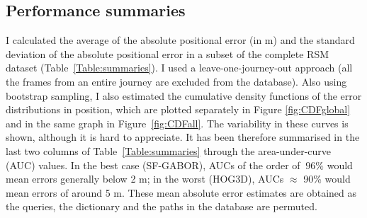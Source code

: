 \subsection{Performance summaries}
\label{visloc_perf}
I calculated the average of the absolute positional error (in m) and the standard deviation of the absolute positional error in a subset of the complete RSM dataset (Table~\ref{Table:summaries}). I  used a leave-one-journey-out approach (all the frames from an entire journey are excluded from the database).  Also using bootstrap sampling, I also estimated the cumulative density functions of the error distributions in position, which are plotted separately in Figure \ref{fig:CDFglobal} and in the same graph in Figure~\ref{fig:CDFall}. The variability in these curves is shown, although it is hard to appreciate. It has been therefore summarised in the last two columns of Table~\ref{Table:summaries} through the area-under-curve (AUC) values. In the best case (SF-GABOR), AUCs of the order of $~96\%$ would mean errors generally below 2 m; in the worst (HOG3D), AUCs $\approx$ 90\% would mean errors of around 5 m.  These  mean absolute error estimates are obtained as the queries, the dictionary and the paths in the database are permuted. 


